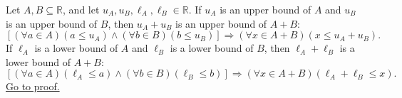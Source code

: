 \begin{proposition}
\label{prop:bounds-sum-set}
Let $A,B\subseteq\mathbb{R}$, and let
$u_A,u_B,\ell_A,\ell_B\in\mathbb{R}$.  If $u_A$ is an upper bound of $A$ and
$u_B$ is an upper bound of $B$, then $u_A+u_B$ is an upper bound of $A+B$:
\[
  \left[(\forall a\in A)(a\leq u_A)\land
  (\forall b\in B)(b\leq u_B)\right]
  \Longrightarrow
  (\forall x\in A+B)(x\leq u_A+u_B).
\]
If $\ell_A$ is a lower bound of $A$ and $\ell_B$ is a lower bound of $B$, then
$\ell_A+\ell_B$ is a lower bound of $A+B$:
\[
  \left[(\forall a\in A)(\ell_A\leq a)\land
  (\forall b\in B)(\ell_B\leq b)\right]
  \Longrightarrow
  (\forall x\in A+B)(\ell_A+\ell_B\leq x).
\]
\hyperref[prf:bounds-sum-set]{Go to proof.}
\end{proposition}